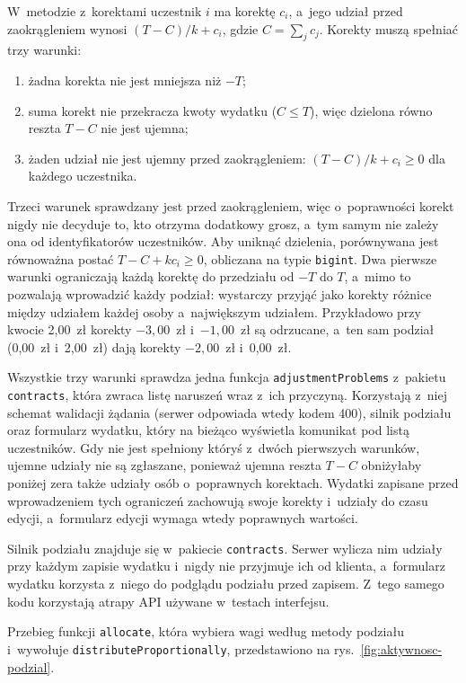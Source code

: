 W~metodzie z~korektami uczestnik $i$ ma korektę $c_i$, a~jego udział przed zaokrągleniem wynosi $(T - C)/k + c_i$, gdzie $C = \sum_j c_j$. Korekty muszą spełniać trzy warunki:

\begin{enumerate}
  \item żadna korekta nie jest mniejsza niż $-T$;
  \item suma korekt nie przekracza kwoty wydatku ($C \le T$), więc dzielona równo reszta $T - C$ nie jest ujemna;
  \item żaden udział nie jest ujemny przed zaokrągleniem: $(T - C)/k + c_i \ge 0$ dla każdego uczestnika.
\end{enumerate}

Trzeci warunek sprawdzany jest przed zaokrągleniem, więc o~poprawności korekt nigdy nie decyduje to, kto otrzyma dodatkowy grosz, a~tym samym nie zależy ona od identyfikatorów uczestników. Aby uniknąć dzielenia, porównywana jest równoważna postać $T - C + k c_i \ge 0$, obliczana na typie \texttt{bigint}. Dwa pierwsze warunki ograniczają każdą korektę do przedziału od $-T$ do $T$, a~mimo to pozwalają wprowadzić każdy podział: wystarczy przyjąć jako korekty różnice między udziałem każdej osoby a~największym udziałem. Przykładowo przy kwocie 2,00~zł korekty $-3{,}00$~zł i~$-1{,}00$~zł są odrzucane, a~ten sam podział (0,00~zł i~2,00~zł) dają korekty $-2{,}00$~zł i~0,00~zł.

Wszystkie trzy warunki sprawdza jedna funkcja \texttt{adjustmentProblems} z~pakietu \texttt{contracts}, która zwraca listę naruszeń wraz z~ich przyczyną. Korzystają z~niej schemat walidacji żądania (serwer odpowiada wtedy kodem 400), silnik podziału oraz formularz wydatku, który na bieżąco wyświetla komunikat pod listą uczestników. Gdy nie jest spełniony któryś z~dwóch pierwszych warunków, ujemne udziały nie są zgłaszane, ponieważ ujemna reszta $T - C$ obniżyłaby poniżej zera także udziały osób o~poprawnych korektach. Wydatki zapisane przed wprowadzeniem tych ograniczeń zachowują swoje korekty i~udziały do czasu edycji, a~formularz edycji wymaga wtedy poprawnych wartości.

Silnik podziału znajduje się w~pakiecie \texttt{contracts}. Serwer wylicza nim udziały przy każdym zapisie wydatku i~nigdy nie przyjmuje ich od klienta, a~formularz wydatku korzysta z~niego do podglądu podziału przed zapisem. Z~tego samego kodu korzystają atrapy API używane w~testach interfejsu.

Przebieg funkcji \texttt{allocate}, która wybiera wagi według metody podziału i~wywołuje \texttt{distributeProportionally}, przedstawiono na rys.~\ref{fig:aktywnosc-podzial}.

